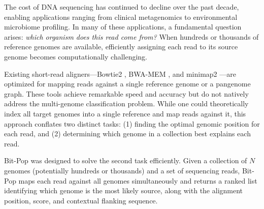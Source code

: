 \documentclass[10pt]{article}
\begin{document}
The cost of DNA sequencing has continued to decline over the past decade, enabling applications ranging from clinical metagenomics to environmental microbiome profiling. In many of these applications, a fundamental question arises: \textit{which organism does this read come from?} When hundreds or thousands of reference genomes are available, efficiently assigning each read to its source genome becomes computationally challenging.

Existing short-read aligners---Bowtie2 \citep{langmead2012}, BWA-MEM \citep{li2013}, and minimap2 \citep{li2018}---are optimized for mapping reads against a single reference genome or a pangenome graph. These tools achieve remarkable speed and accuracy but do not natively address the multi-genome classification problem. While one could theoretically index all target genomes into a single reference and map reads against it, this approach conflates two distinct tasks: (1) finding the optimal genomic position for each read, and (2) determining which genome in a collection best explains each read.

Bit-Pop was designed to solve the second task efficiently. Given a collection of $N$ genomes (potentially hundreds or thousands) and a set of sequencing reads, Bit-Pop maps each read against all genomes simultaneously and returns a ranked list identifying which genome is the most likely source, along with the alignment position, score, and contextual flanking sequence.
\end{document}
